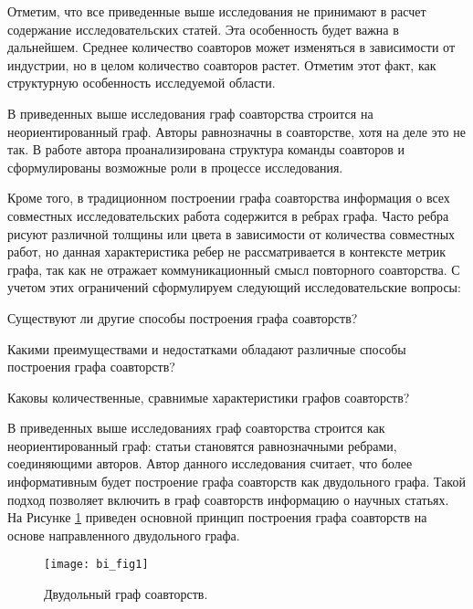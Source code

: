 Отметим, что все приведенные выше исследования не принимают в расчет содержание исследовательских статей.
Эта особенность будет важна в дальнейшем. 
Среднее количество соавторов может изменяться в зависимости от индустрии, но в целом количество соавторов растет.
Отметим этот факт, как структурную особенность исследуемой области. 

В приведенных выше исследования граф соавторства строится на неориентированный граф.
Авторы равнозначны в соавторстве, хотя на деле это не так. 
В работе автора \cite{krasnov2017model} проанализирована структура команды соавторов и сформулированы возможные роли в процессе исследования. 

Кроме того, в традиционном построении графа соавторства информация о всех совместных исследовательских работа содержится в ребрах графа. 
Часто ребра рисуют различной толщины или цвета в зависимости от количества совместных работ, но данная характеристика ребер не рассматривается в контексте метрик графа, так как не отражает коммуникационный смысл повторного соавторства.
С учетом этих ограничений сформулируем следующий исследовательские вопросы: 

\begin{que} 
\label{que:ex1}
Существуют ли другие способы построения графа соавторств? 
\end{que}

\begin{que} 
\label{que:ex2}
Какими преимуществами и недостатками обладают различные способы построения графа соавторств? 
\end{que}

\begin{que}
\label{que:ex3}
Каковы количественные, сравнимые характеристики графов соавторств? 
\end{que}

В приведенных выше исследованиях граф соавторства строится как неориентированный граф: статьи становятся равнозначными ребрами, соединяющими авторов. 
Автор данного исследования считает, что более информативным будет построение графа соавторств как двудольного графа. 
Такой подход позволяет включить в граф соавторств информацию о научных статьях. 
На Рисунке \ref{fig:bi1} приведен основной принцип построения графа соавторств на основе направленного двудольного графа. 
 
\begin{figure}[H]
  \centering
    \texttt{[image: bi\_fig1]}
  \label{fig:bi1}
  \caption{Двудольный граф соавторств.}
\end{figure}  
 
